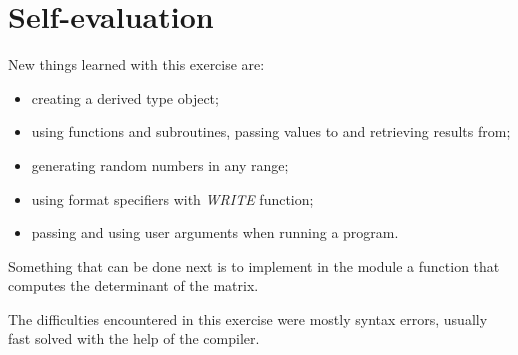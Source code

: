 \documentclass[11pt,a4paper]{article}
\begin{document}
\section{Self-evaluation} %
New things learned with this exercise are:
\begin{itemize}
	\item creating a derived type object;
	\item using functions and subroutines, passing values to and retrieving results from;
	\item generating random numbers in any range;
	\item using format specifiers with \textit{WRITE} function;
	\item passing and using user arguments when running a program.
\end{itemize}
Something that can be done next is to implement in the module a function that computes the determinant of the matrix.

The difficulties encountered in this exercise were mostly syntax errors, usually fast solved with the help of the compiler.
	
\end{document}
